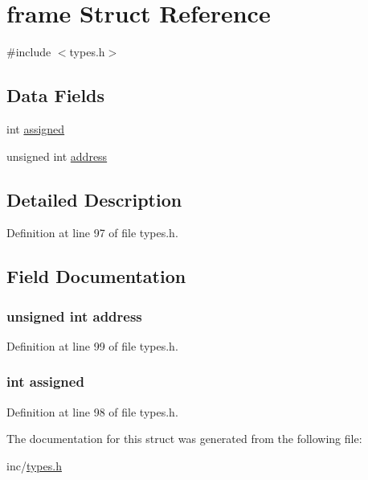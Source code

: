 \hypertarget{structframe}{
\section{frame Struct Reference}
\label{structframe}
}


{\ttfamily \#include $<$types.h$>$}

\subsection*{Data Fields}
\begin{DoxyCompactItemize}
\item 
int \hyperlink{structframe_a2602074f4e3c3e245e59f512aa565fcc}{assigned}
\item 
unsigned int \hyperlink{structframe_a2f55ff1f6cd45ca1b6431493ab5614eb}{address}
\end{DoxyCompactItemize}


\subsection{Detailed Description}


Definition at line 97 of file types.h.



\subsection{Field Documentation}
\hypertarget{structframe_a2f55ff1f6cd45ca1b6431493ab5614eb}{
\subsubsection[{address}]{\setlength{\rightskip}{0pt plus 5cm}unsigned int {\bf address}}}
\label{structframe_a2f55ff1f6cd45ca1b6431493ab5614eb}


Definition at line 99 of file types.h.

\hypertarget{structframe_a2602074f4e3c3e245e59f512aa565fcc}{
\subsubsection[{assigned}]{\setlength{\rightskip}{0pt plus 5cm}int {\bf assigned}}}
\label{structframe_a2602074f4e3c3e245e59f512aa565fcc}


Definition at line 98 of file types.h.



The documentation for this struct was generated from the following file:\begin{DoxyCompactItemize}
\item 
inc/\hyperlink{types_8h}{types.h}\end{DoxyCompactItemize}

